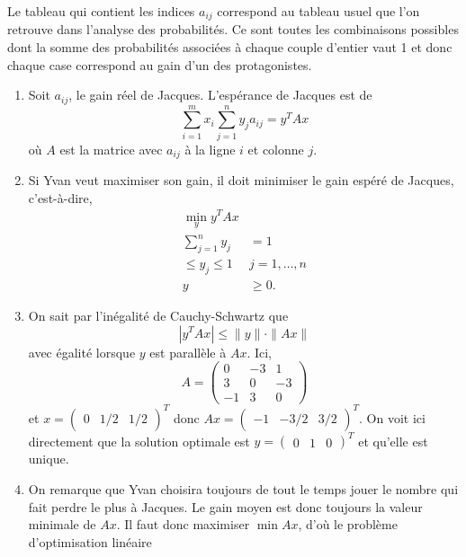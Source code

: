 \begin{enumerate}
\begin{solution}
      Le tableau qui contient les indices $a_{ij}$ correspond au tableau
      usuel que l'on retrouve dans l'analyse des probabilités.
      Ce sont toutes les combinaisons possibles dont la somme des probabilités
      associées à chaque couple d'entier vaut 1
      et donc chaque case correspond au gain d'un des protagonistes.
      \begin{enumerate}
        \item Soit $a_{ij}$, le gain réel de Jacques.
          L'espérance de Jacques est de
          $$\sum_{i=1}^{m}x_{i}\sum_{j=1}^{n}y_{j}a_{ij} = y^TAx$$
          où $A$ est la matrice avec $a_{ij}$ à la ligne $i$ et colonne $j$.
        \item Si Yvan veut maximiser son gain,
          il doit minimiser le gain espéré de Jacques, c'est-à-dire,
          \begin{align*}
            \min_y y^TAx\\
            \sum_{j=1}^n y_j & = 1\\
            \leq y_j \leq 1 & j = 1, \dots, n\\
            y & \geq 0.
          \end{align*}
        \item
          On sait par l'inégalité de Cauchy-Schwartz que
          \[ |y^TAx| \leq \|y\|\cdot\|Ax\| \]
          avec égalité lorsque $y$ est parallèle à $Ax$.
          Ici,
          \[ A =
            \begin{pmatrix}
              0 & -3 & 1\\
              3 & 0 & -3\\
              -1 & 3 & 0
          \end{pmatrix} \]
          et $x = \begin{pmatrix}0 & 1/2 & 1/2\end{pmatrix}^T$
          donc $Ax = \begin{pmatrix}-1 & -3/2 & 3/2\end{pmatrix}^T$.
          On voit ici directement que la solution optimale est
          $y = \begin{pmatrix}0 & 1 & 0\end{pmatrix}^T$ et qu'elle est
          unique.
        \item On remarque que Yvan choisira toujours de tout le temps jouer
          le nombre qui fait perdre le plus à Jacques.
          Le gain moyen est donc toujours la valeur minimale de $Ax$.
          Il faut donc maximiser $\min Ax$, d'où le problème
          d'optimisation linéaire

\end{enumerate}
\end{solution}
\end{enumerate}
